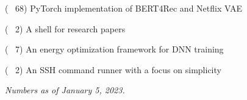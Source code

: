 
\begin{cvlist}

  \cvlistitem
  {\href{https://github.com/jaywonchung/BERT4Rec-VAE-Pytorch}{} {\normalfont ( \faCodeFork~68)}} %
    {PyTorch implementation of BERT4Rec and Netflix VAE} %

  \cvlistitem
    {\href{https://github.com/jaywonchung/reason}{} {\normalfont ( \faCodeFork~2)}} %
    {A shell for research papers} %

  \cvlistitem
    {\href{https://github.com/SymbioticLab/Zeus}{} {\normalfont ( \faCodeFork~7)}} %
    {An energy optimization framework for DNN training} %

  \cvlistitem
    {\href{https://github.com/jaywonchung/pegasus}{} {\normalfont ( \faCodeFork~2)}} %
    {An SSH command runner with a focus on simplicity} %

\end{cvlist}

\vspace{-5mm}

\begin{cvparagraph}
\textit{Numbers as of January 5, 2023.}
\end{cvparagraph}
